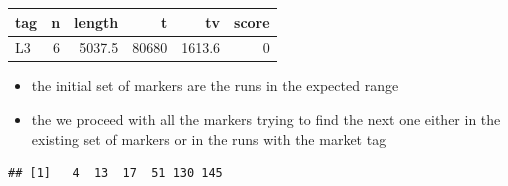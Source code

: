 \documentclass[]{article}
\newenvironment{Shaded}{\begin{snugshade}}{\end{snugshade}}
\newcommand{\KeywordTok}[1]{\textcolor[rgb]{0.13,0.29,0.53}{\textbf{{#1}}}}
\newcommand{\StringTok}[1]{\textcolor[rgb]{0.31,0.60,0.02}{{#1}}}
\newcommand{\NormalTok}[1]{{#1}}
\begin{document}
\begin{longtable}[c]{@{}lrrrrr@{}}
\toprule
tag & n & length & t & tv & score\tabularnewline
\midrule
\endhead
L3 & 6 & 5037.5 & 80680 & 1613.6 & 0\tabularnewline
\bottomrule
\end{longtable}

\begin{itemize}
\item
  the initial set of markers are the runs in the expected range
\item
  the we proceed with all the markers trying to find the next one either
  in the existing set of markers or in the runs with the market tag
\end{itemize}

\begin{Shaded}
\end{Shaded}

\begin{verbatim}
## [1]   4  13  17  51 130 145
\end{verbatim}
\end{document}
